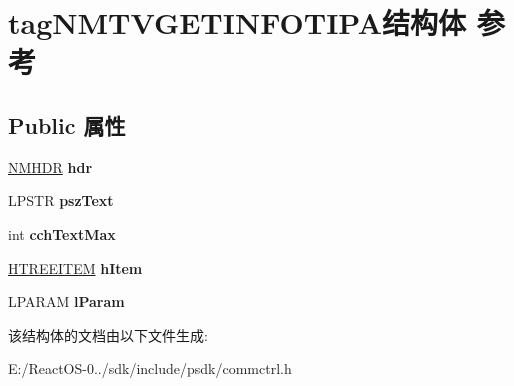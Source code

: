 \hypertarget{structtag_n_m_t_v_g_e_t_i_n_f_o_t_i_p_a}{}\section{tag\+N\+M\+T\+V\+G\+E\+T\+I\+N\+F\+O\+T\+I\+P\+A结构体 参考}
\label{structtag_n_m_t_v_g_e_t_i_n_f_o_t_i_p_a}
\subsection*{Public 属性}
\begin{DoxyCompactItemize}
\item 
\mbox{\label{structtag_n_m_t_v_g_e_t_i_n_f_o_t_i_p_a_a5cb35fde5226c65a4545d64df8d0c694}} 
\hyperlink{structtag_n_m_h_d_r}{N\+M\+H\+DR} {\bfseries hdr}
\item 
\mbox{\label{structtag_n_m_t_v_g_e_t_i_n_f_o_t_i_p_a_a0c285d31bc801fc3055aa96048fdca72}} 
L\+P\+S\+TR {\bfseries psz\+Text}
\item 
\mbox{\label{structtag_n_m_t_v_g_e_t_i_n_f_o_t_i_p_a_a00f832404011cc321714f55fa8ed2df0}} 
int {\bfseries cch\+Text\+Max}
\item 
\mbox{\label{structtag_n_m_t_v_g_e_t_i_n_f_o_t_i_p_a_af4a68ac208d95819068a5b87fa5f8739}} 
\hyperlink{struct___t_r_e_e_i_t_e_m}{H\+T\+R\+E\+E\+I\+T\+EM} {\bfseries h\+Item}
\item 
\mbox{\label{structtag_n_m_t_v_g_e_t_i_n_f_o_t_i_p_a_abee72a960f301da2e68bedd3b7133eb5}} 
L\+P\+A\+R\+AM {\bfseries l\+Param}
\end{DoxyCompactItemize}


该结构体的文档由以下文件生成\+:\begin{DoxyCompactItemize}
\item 
E\+:/\+React\+O\+S-\/0../sdk/include/psdk/commctrl.\+h\end{DoxyCompactItemize}
